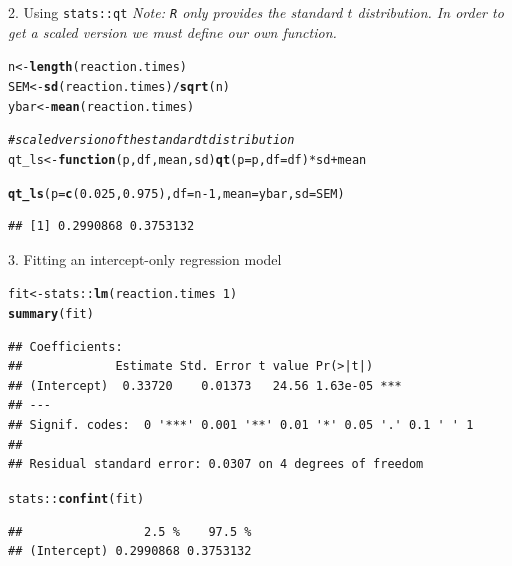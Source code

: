 \documentclass[10pt]{beamer}\usepackage[]{graphicx}\usepackage[]{color}
\makeatletter
\newcommand{\hlnum}[1]{\textcolor[rgb]{0.686,0.059,0.569}{#1}}%
\newcommand{\hlcom}[1]{\textcolor[rgb]{0.678,0.584,0.686}{\textit{#1}}}%
\newcommand{\hlopt}[1]{\textcolor[rgb]{0,0,0}{#1}}%
\newcommand{\hlstd}[1]{\textcolor[rgb]{0.345,0.345,0.345}{#1}}%
\newcommand{\hlkwa}[1]{\textcolor[rgb]{0.161,0.373,0.58}{\textbf{#1}}}%
\newcommand{\hlkwb}[1]{\textcolor[rgb]{0.69,0.353,0.396}{#1}}%
\newcommand{\hlkwc}[1]{\textcolor[rgb]{0.333,0.667,0.333}{#1}}%
\newcommand{\hlkwd}[1]{\textcolor[rgb]{0.737,0.353,0.396}{\textbf{#1}}}%
\newenvironment{kframe}{%
 \def\at@end@of@kframe{}%
 \ifinner\ifhmode%
  \def\at@end@of@kframe{\end{minipage}}%
  \begin{minipage}{\columnwidth}%
 \fi\fi%
 \def\FrameCommand##1{\hskip\@totalleftmargin \hskip-\fboxsep
 \colorbox{shadecolor}{##1}\hskip-\fboxsep
     \hskip-\linewidth \hskip-\@totalleftmargin \hskip\columnwidth}%
 \MakeFramed {\advance\hsize-\width
   \@totalleftmargin\z@ \linewidth\hsize
   \@setminipage}}%
 {\par\unskip\endMakeFramed%
 \at@end@of@kframe}
\newenvironment{knitrout}{}{} %
\makeatother
\begin{document}
\begin{frame}[fragile]{2. Using \texttt{stats::qt}}
	\textit{Note: \texttt{R} only provides the standard $t$ distribution. In order to get a scaled version we must define our own function.}
	
	\vspace*{0.2in}
	
\begin{knitrout}\tiny
{}\color{fgcolor}\begin{kframe}
\begin{alltt}
\hlstd{n} \hlkwb{<-} \hlkwd{length}\hlstd{(reaction.times)}
\hlstd{SEM} \hlkwb{<-} \hlkwd{sd}\hlstd{(reaction.times)}\hlopt{/}\hlkwd{sqrt}\hlstd{(n)}
\hlstd{ybar} \hlkwb{<-} \hlkwd{mean}\hlstd{(reaction.times)}

\hlcom{# scaled version of the standard t distribution}
\hlstd{qt_ls} \hlkwb{<-} \hlkwa{function}\hlstd{(}\hlkwc{p}\hlstd{,} \hlkwc{df}\hlstd{,} \hlkwc{mean}\hlstd{,} \hlkwc{sd}\hlstd{)} \hlkwd{qt}\hlstd{(}\hlkwc{p} \hlstd{= p,} \hlkwc{df} \hlstd{= df)} \hlopt{*} \hlstd{sd} \hlopt{+} \hlstd{mean}

\hlkwd{qt_ls}\hlstd{(}\hlkwc{p} \hlstd{=} \hlkwd{c}\hlstd{(}\hlnum{0.025}\hlstd{,} \hlnum{0.975}\hlstd{),} \hlkwc{df} \hlstd{= n} \hlopt{-} \hlnum{1}\hlstd{,} \hlkwc{mean} \hlstd{= ybar,} \hlkwc{sd} \hlstd{= SEM)}
\end{alltt}
\begin{verbatim}
## [1] 0.2990868 0.3753132
\end{verbatim}
\end{kframe}
\end{knitrout}
\end{frame}


\begin{frame}[fragile]{3. Fitting an intercept-only regression model}
\begin{knitrout}\tiny
{}\color{fgcolor}\begin{kframe}
\begin{alltt}
\hlstd{fit} \hlkwb{<-} \hlstd{stats}\hlopt{::}\hlkwd{lm}\hlstd{(reaction.times} \hlopt{~} \hlnum{1}\hlstd{)}
\hlkwd{summary}\hlstd{(fit)}
\end{alltt}
\begin{verbatim}
## Coefficients:
##             Estimate Std. Error t value Pr(>|t|)    
## (Intercept)  0.33720    0.01373   24.56 1.63e-05 ***
## ---
## Signif. codes:  0 '***' 0.001 '**' 0.01 '*' 0.05 '.' 0.1 ' ' 1
## 
## Residual standard error: 0.0307 on 4 degrees of freedom
\end{verbatim}
\begin{alltt}
\hlstd{stats}\hlopt{::}\hlkwd{confint}\hlstd{(fit)}
\end{alltt}
\begin{verbatim}
##                 2.5 %    97.5 %
## (Intercept) 0.2990868 0.3753132
\end{verbatim}
\end{kframe}
\end{knitrout}
\end{frame}
\end{document}
